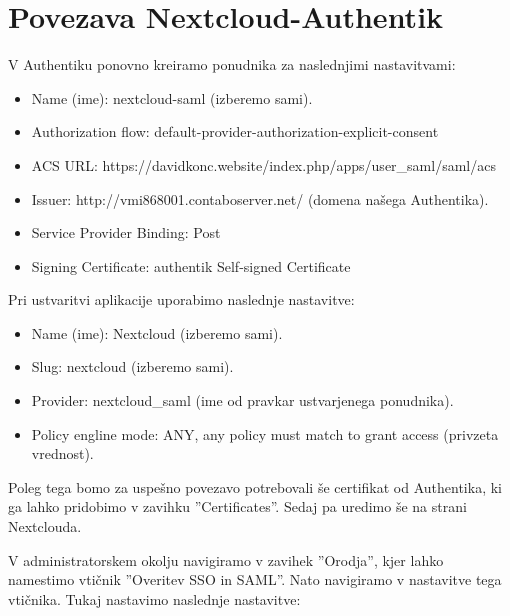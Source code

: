 \documentclass[a4paper,12pt,openright]{book}
\begin{document}
\section{Povezava Nextcloud-Authentik}
V Authentiku ponovno kreiramo ponudnika za naslednjimi nastavitvami:
\begin{itemize}
    \item Name (ime): nextcloud-saml (izberemo sami).
    \item Authorization flow: default-provider-authorization-explicit-consent 
    \item ACS URL: https://davidkonc.website/index.php/apps/user\_saml/saml/acs
    \item Issuer: http://vmi868001.contaboserver.net/ (domena našega Authentika).
    \item Service Provider Binding:  Post
    \item Signing Certificate: authentik Self-signed Certificate
\end{itemize}
Pri ustvaritvi aplikacije uporabimo naslednje nastavitve:

\begin{itemize}
    \item Name (ime): Nextcloud (izberemo sami).
    \item Slug: nextcloud (izberemo sami).
    \item Provider: nextcloud\_saml (ime od pravkar ustvarjenega ponudnika).
    \item Policy engline mode: ANY, any policy must match to grant access (privzeta vrednost). 
\end{itemize}

Poleg tega bomo za uspešno povezavo potrebovali še certifikat od Authentika, ki ga lahko pridobimo v zavihku ''Certificates''. Sedaj pa uredimo še na strani Nextclouda.

V administratorskem okolju navigiramo v zavihek ''Orodja'', kjer lahko namestimo vtičnik ''Overitev SSO in SAML''. Nato navigiramo v nastavitve tega vtičnika. Tukaj nastavimo naslednje nastavitve:
\end{document}
